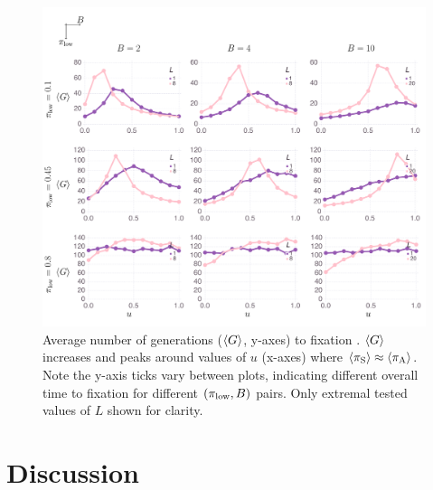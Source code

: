 \documentclass[letterpaper,11.5pt]{scrartcl}
\begin{document}
\begin{figure}
  \caption{Average number of generations ($\langle G \rangle$, y-axes) to fixation . 
    $\langle G \rangle$ increases and peaks around values of $u$ (x-axes) where
  $\langle \pi_\mathrm{S} \rangle \approx \langle \pi_\mathrm{A} \rangle$. Note the y-axis ticks vary between plots,
indicating different overall time to fixation for different $(\pi_{\mathrm{low}}, B)$
pairs. Only extremal tested values of $L$ shown for clarity.} 
  \label{fig:steps}
\centering
    \includegraphics[width=\textwidth]{Figures/stepResultsPlots.pdf}
\end{figure}


\section{Discussion}
\end{document}

